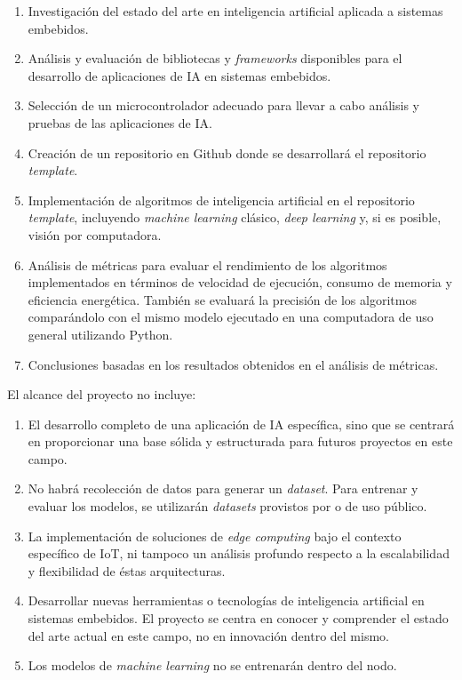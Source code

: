 \documentclass[
11pt, %
codirector, %
]{charter}
\begin{document}
\begin{enumerate}
\item Investigación del estado del arte en inteligencia artificial aplicada a sistemas embebidos.
\item Análisis y evaluación de bibliotecas y \textit{frameworks} disponibles para el desarrollo de aplicaciones de IA en sistemas embebidos.
\item Selección de un microcontrolador adecuado para llevar a cabo análisis y pruebas de las aplicaciones de IA.
\item Creación de un repositorio en Github donde se desarrollará el repositorio \textit{template}.
\item Implementación de algoritmos de inteligencia artificial en el repositorio \textit{template}, incluyendo \textit{machine learning} clásico, \textit{deep learning} y, si es posible, visión por computadora.
\item Análisis de métricas para evaluar el rendimiento de los algoritmos implementados en términos de velocidad de ejecución, consumo de memoria y eficiencia energética. También se evaluará la precisión de los algoritmos comparándolo con el mismo modelo ejecutado en una computadora de uso general utilizando Python.
\item Conclusiones basadas en los resultados obtenidos en el análisis de métricas.
\end{enumerate}

El alcance del proyecto no incluye:
\begin{enumerate}
\item  El desarrollo completo de una aplicación de IA específica, sino que se centrará en proporcionar una base sólida y estructurada para futuros proyectos en este campo. 
\item No habrá recolección de datos para generar un \textit{dataset}. Para entrenar y evaluar los modelos, se utilizarán \textit{datasets} provistos por \empclientename o de uso público. 
\item La implementación de soluciones de \textit{edge computing} bajo el contexto específico de IoT, ni tampoco un análisis profundo respecto a la escalabilidad y flexibilidad de éstas arquitecturas. 
\item Desarrollar nuevas herramientas o tecnologías de inteligencia artificial en sistemas embebidos. El proyecto se centra en conocer y comprender el estado del arte actual en este campo, no en innovación dentro del mismo.
\item Los modelos de \textit{machine learning} no se entrenarán dentro del nodo.
\end{enumerate}
\end{document}
